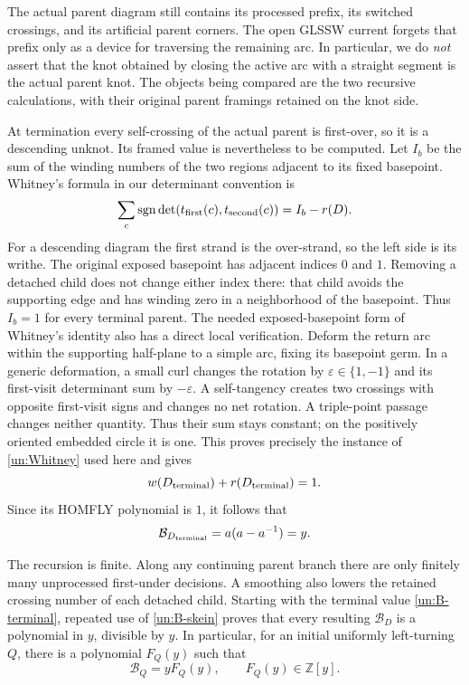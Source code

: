 \documentclass[11pt,letterpaper]{article}
\numberwithin{equation}{section}
\theoremstyle{definition}
\theoremstyle{remark}
\begin{document}
The actual parent diagram still contains its processed prefix, its
switched crossings, and its artificial parent corners.  The open
GLSSW current forgets that prefix only as a device for traversing the
remaining arc.  In particular, we do \emph{not} assert that the knot
obtained by closing the active arc with a straight segment is the actual
parent knot.  The objects being compared are the two recursive
calculations, with their original parent framings retained on the knot
side.

At termination every self-crossing of the actual parent is first-over,
so it is a descending unknot.  Its framed value is nevertheless to be
computed.  Let $I_b$ be the sum of the winding numbers of the two regions
adjacent to its fixed basepoint.  Whitney's formula in our determinant
convention is
\begin{equation}
 \sum_c\operatorname{sgn}\det(t_{\rm first}(c),t_{\rm second}(c))
       =I_b-r(D).
 \label{un:Whitney}
\end{equation}
For a descending diagram the first strand is the over-strand, so the
left side is its writhe.  The original exposed basepoint has adjacent
indices $0$ and $1$.  Removing a detached child does not change either
index there: that child avoids the supporting edge and has winding zero
in a neighborhood of the basepoint.  Thus $I_b=1$ for every terminal
parent.  The needed exposed-basepoint form of Whitney's identity also
has a direct local verification.  Deform the return arc within the
supporting half-plane to a simple arc, fixing its basepoint germ.
In a generic deformation, a small curl changes the rotation by
$\varepsilon\in\{1,-1\}$ and its first-visit determinant sum by
$-\varepsilon$.  A self-tangency creates two crossings with opposite
first-visit signs and changes no net rotation.  A triple-point passage
changes neither quantity.  Thus their sum stays constant; on the
positively oriented embedded circle it is one.  This proves precisely
the instance of \eqref{un:Whitney} used here and gives
\begin{equation}
 w(D_{\rm terminal})+r(D_{\rm terminal})=1.
 \label{un:terminal-frame}
\end{equation}
Since its HOMFLY polynomial is $1$, it follows that
\begin{equation}
 \mathcal B_{D_{\rm terminal}}=a(a-a^{-1})=y.
 \label{un:B-terminal}
\end{equation}

The recursion is finite.  Along any continuing parent branch there are
only finitely many unprocessed first-under decisions.  A smoothing also
lowers the retained crossing number of each detached child.  Starting
with the terminal value \eqref{un:B-terminal}, repeated use of
\eqref{un:B-skein} proves that every resulting $\mathcal B_D$ is a
polynomial in $y$, divisible by $y$.  In particular, for an initial
uniformly left-turning $Q$, there is a polynomial $F_Q(y)$ such that
\begin{equation}
 \mathcal B_Q=yF_Q(y),\qquad F_Q(y)\in\mathbb Z[y].
 \label{un:F-polynomial}
\end{equation}
\end{document}
